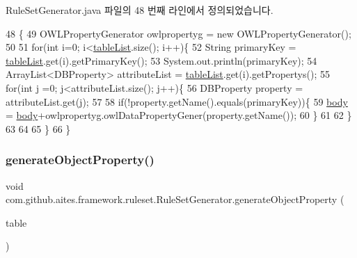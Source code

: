 Rule\+Set\+Generator.\+java 파일의 48 번째 라인에서 정의되었습니다.


\begin{DoxyCode}
48                                       \{
49         OWLPropertyGenerator owlpropertyg = \textcolor{keyword}{new} OWLPropertyGenerator();
50         
51         \textcolor{keywordflow}{for}(\textcolor{keywordtype}{int} i=0; i<\mbox{\hyperlink{classcom_1_1github_1_1aites_1_1framework_1_1ruleset_1_1_rule_set_generator_ac7d8dddafc874c8c1d0bdedfec634d6d}{tableList}}.size(); i++)\{
52             String primaryKey = \mbox{\hyperlink{classcom_1_1github_1_1aites_1_1framework_1_1ruleset_1_1_rule_set_generator_ac7d8dddafc874c8c1d0bdedfec634d6d}{tableList}}.get(i).getPrimaryKey();
53             System.out.println(primaryKey);
54             ArrayList<DBProperty> attributeList = \mbox{\hyperlink{classcom_1_1github_1_1aites_1_1framework_1_1ruleset_1_1_rule_set_generator_ac7d8dddafc874c8c1d0bdedfec634d6d}{tableList}}.get(i).getPropertys();
55             \textcolor{keywordflow}{for}(\textcolor{keywordtype}{int} j =0; j<attributeList.size(); j++)\{
56                 DBProperty \textcolor{keyword}{property} = attributeList.get(j);
57                 
58                 \textcolor{keywordflow}{if}(!property.getName().equals(primaryKey))\{
59                     \mbox{\hyperlink{classcom_1_1github_1_1aites_1_1framework_1_1ruleset_1_1_rule_set_generator_a1fbfa36b17c118b50f731278af7d8ae5}{body}} = \mbox{\hyperlink{classcom_1_1github_1_1aites_1_1framework_1_1ruleset_1_1_rule_set_generator_a1fbfa36b17c118b50f731278af7d8ae5}{body}}+owlpropertyg.owlDataPropertyGener(property.getName());
60                 \}
61                 
62             \}
63             
64             
65         \}
66     \}
\end{DoxyCode}
\mbox{\label{classcom_1_1github_1_1aites_1_1framework_1_1ruleset_1_1_rule_set_generator_a5bdcfcca00ceceed061f630962d19801}} 
\subsubsection{\texorpdfstring{generate\+Object\+Property()}{generateObjectProperty()}}
{\footnotesize\ttfamily void com.\+github.\+aites.\+framework.\+ruleset.\+Rule\+Set\+Generator.\+generate\+Object\+Property (\begin{DoxyParamCaption}\item[{\mbox{\hyperlink{classcom_1_1github_1_1aites_1_1framework_1_1dbcomponent_1_1_d_b_table}{D\+B\+Table}}}]{table }\end{DoxyParamCaption})}



